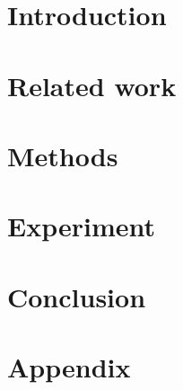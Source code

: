 \documentclass[12pt]{article}
\begin{document}




\section{Introduction}


\section{Related work}


\section{Methods}


\section{Experiment}


\section{Conclusion}

\pagebreak




\pagebreak

\section*{Appendix}

\end{document}
